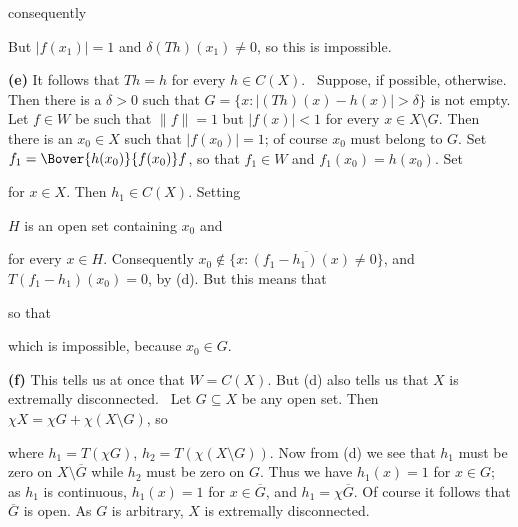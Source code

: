 {

\noindent consequently


\noindent But $|f(x_1)|=1$ and $\delta(Th)(x_1)\ne 0$, so this is
impossible.\ \Bang\Qed

\medskip

{\bf (e)} It follows that $Th=h$ for every $h\in C(X)$.   \Prf\Quer\
Suppose, if possible, otherwise.   Then there is a $\delta>0$ such that
$G=\{x:|(Th)(x)-h(x)|>\delta\}$ is not empty.   Let $f\in W$ be such
that $\|f\|=1$ but $|f(x)|<1$ for every $x\in X\setminus G$.   Then
there is an $x_0\in X$ such that $|f(x_0)|=1$;  of course $x_0$ must
belong to $G$.   Set $f_1=\Bover{h(x_0)}{f(x_0)}f$, so that $f_1\in W$
and $f_1(x_0)=h(x_0)$.   Set


\noindent for $x\in X$.   Then $h_1\in C(X)$.   Setting


\noindent $H$ is an open set containing $x_0$ and


\noindent for
every $x\in H$.   Consequently
$x_0\notin\overline{\{x:(f_1-h_1)(x)\ne 0\}}$, and $T(f_1-h_1)(x_0)=0$,
by (d).   But this means that


\noindent so that


\noindent which is impossible, because $x_0\in G$.\ \Bang\Qed

\medskip

{\bf (f)} This tells us at once that $W=C(X)$.   But (d) also tells us
that $X$ is extremally disconnected.   \Prf\  Let $G\subseteq X$ be any
open set.   Then $\chi X=\chi G+\chi(X\setminus G)$, so


\noindent where $h_1=T(\chi G)$, $h_2=T(\chi(X\setminus G))$.   Now
from (d) we see that $h_1$
must be zero on $X\setminus\overline{G}$ while $h_2$ must be zero on
$G$.   Thus we have $h_1(x)=1$ for $x\in G$;  as $h_1$ is continuous,
$h_1(x)=1$ for $x\in\overline{G}$, and $h_1=\chi\overline G$.   Of
course it follows that $\overline{G}$ is open.   As $G$ is arbitrary,
$X$ is extremally disconnected.\ \Qed

}
